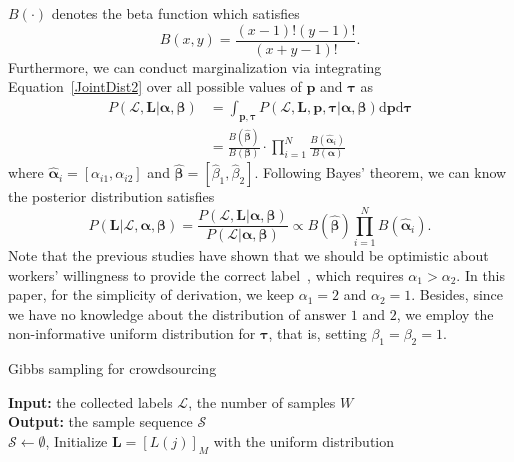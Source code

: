 \documentclass{article}
\begin{document}
$B(\cdot)$ denotes the beta function which satisfies
\begin{equation}
B(x,y)=\frac{(x-1)!(y-1)!}{(x+y-1)!}.
\end{equation}
Furthermore, we can conduct marginalization via integrating Equation~\ref{JointDist2} over all possible values of $\bm{p}$ and $\bm{\tau}$ as
\begin{equation}
\begin{split}
P(\mathcal{L},\bm{L}|\bm{\alpha}, \bm{\beta})&=\int_{\bm{p}, \bm{\tau}} P(\mathcal{L},\bm{L},\bm{p}, \bm{\tau}|\bm{\alpha}, \bm{\beta})\mathrm{d}\bm{p}\mathrm{d} \bm{\tau}\\
&=\frac{B(\hat{\bm{\beta}})}{B(\bm{\beta})}\cdot \prod_{i=1}^{N}\frac{B(\hat{\bm{\alpha}}_{i})}{B(\bm{\alpha})}
\end{split}
\end{equation}
where $\hat{\bm{\alpha}}_i=[\alpha_{i1},\alpha_{i2}]$ and $\hat{\bm{\beta}}=[\hat{\beta}_1,\hat{\beta}_2]$. Following Bayes' theorem, we can know the posterior distribution satisfies
\begin{equation}
\label{PostDist}
P(\bm{L}|\mathcal{L}, \bm{\alpha}, \bm{\beta})=\frac{P(\mathcal{L},\bm{L}|\bm{\alpha}, \bm{\beta})}{P(\mathcal{L}|\bm{\alpha}, \bm{\beta})}\propto B(\hat{\bm{\beta}})\prod_{i=1}^{N}B(\hat{\bm{\alpha}}_{i}). 
\end{equation}
Note that the previous studies have shown that we should be optimistic about workers' willingness to provide the correct label~\cite{chen2015statistical}, which requires $\alpha_1>\alpha_2$.
In this paper, for the simplicity of derivation, we keep $\alpha_1=2$ and $\alpha_2=1$.
Besides, since we have no knowledge about the distribution of answer $1$ and $2$, we employ the non-informative uniform distribution for $\bm{\tau}$, that is, setting $\beta_1=\beta_2=1$.

\begin{algorithm}[t]
  \caption{\label{GSC} Gibbs sampling for crowdsourcing}
  \small
  \DontPrintSemicolon
  \textbf{Input: } the collected labels $\mathcal{L}$, the number of samples $W$\\
  \textbf{Output: } the sample sequence $\mathcal{S}$ \\
  \vspace{0.5mm}
  \nl $\mathcal{S}\leftarrow\emptyset$, Initialize $\bm{L}=[L(j)]_M$ with the uniform distribution\;
  \nl {}
   \end{algorithm}
\end{document}
